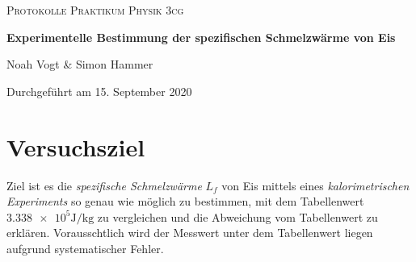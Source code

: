 \documentclass[a4paper,12pt]{article}
\begin{document}
\begin{titlepage}

\vspace*{1cm}
	\centering
	
	{\scshape\Large Protokolle Praktikum Physik 3cg \par}
	\vspace{0.5cm}
	{\huge\bfseries Experimentelle Bestimmung der spezifischen Schmelzwärme von Eis\par}
	\vspace{0.5cm}
	{\Large Noah Vogt \& Simon Hammer\par}
	\vspace{17cm}

	{\large Durchgeführt am 15. September 2020\par}
	
\end{titlepage}

\tableofcontents
\pagebreak

\section{Versuchsziel}
Ziel ist es die \textit{spezifische Schmelzwärme} $L_f$ von Eis mittels eines \textit{kalorimetrischen Experiments} so genau wie möglich zu bestimmen, mit dem Tabellenwert $\num{3.338 e5}\si{\J\per\kg}$ \cite{formelsammlung} zu vergleichen und die Abweichung vom Tabellenwert zu erklären. Vorausschtlich wird der Messwert unter dem Tabellenwert liegen aufgrund systematischer Fehler.
\end{document}
